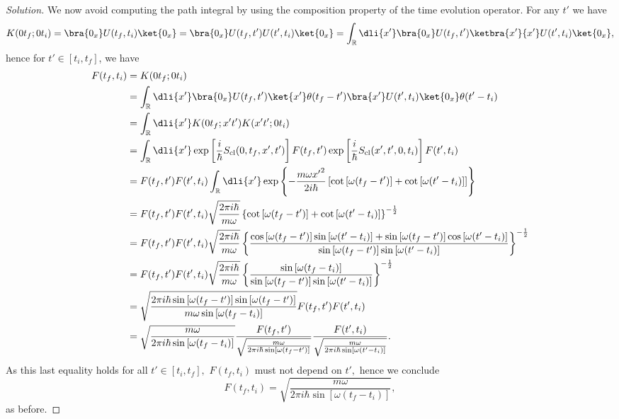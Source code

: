 \begin{proof}[Solution]
   We now avoid computing the path integral by using the composition property of the time evolution operator. For any \(t'\) we have
   \begin{equation*}
      K(0 t_f; 0 t_i) = \bra{0_x} U(t_f, t_i) \ket{0_x} = \bra{0_x} U(t_f, t') U(t', t_i) \ket{0_x} = \int_{\mathbb{R}}\dli{x'} \bra{0_x} U(t_f, t') \ketbra{x'}{x'} U(t', t_i) \ket{0_x},
   \end{equation*}
   hence for \(t' \in [t_i, t_f]\), we have
   \begin{align*}
      F(t_f, t_i) &= K(0 t_f; 0 t_i)\\
                  &= \int_{\mathbb{R}} \dli{x'} \bra{0_x}U(t_f, t')\ket{x'} \theta(t_f - t') \bra{x'} U(t', t_i) \ket{0_x} \theta(t' - t_i)\\
                  &= \int_{\mathbb{R}} \dli{x'} K(0t_f; x' t') K(x' t'; 0t_i)\\
                  &= \int_{\mathbb{R}} \dli{x'} \exp\left[\frac{i}{\hbar}S_\mathrm{cl}(0, t_f, x', t')\right] F(t_f, t') \exp\left[\frac{i}{\hbar}S_\mathrm{cl}(x', t', 0, t_i)\right] F(t', t_i)\\
                  &= F(t_f, t') F(t', t_i) \int_{\mathbb{R}} \dli{x'} \exp\left\{-\frac{m \omega {x'}^2}{2i\hbar} \left[\cot\left[\omega(t_f - t')\right] + \cot\left[\omega(t' - t_i)\right] \right]\right\}\\
                  &= F(t_f, t') F(t', t_i) \sqrt{\frac{2 \pi i\hbar}{m \omega}} \left\{\cot\left[\omega(t_f - t')\right] + \cot\left[\omega(t' - t_i)\right]\right\}^{-\frac12}\\
                  &= F(t_f, t') F(t', t_i) \sqrt{\frac{2 \pi i \hbar}{m \omega}} \left\{\frac{\cos\left[\omega(t_f - t')\right]\sin\left[\omega(t' - t_i)\right] + \sin\left[\omega(t_f - t')\right]\cos\left[\omega(t' - t_i)\right]}{\sin\left[\omega(t_f - t')\right]\sin\left[\omega(t' - t_i)\right]}\right\}^{-\frac12}\\
                  &= F(t_f, t') F(t', t_i) \sqrt{\frac{2 \pi i \hbar}{m \omega}} \left\{\frac{\sin\left[\omega(t_f - t_i)\right]}{\sin\left[\omega(t_f - t')\right]\sin\left[\omega(t' - t_i)\right]}\right\}^{-\frac12}\\
                  &= \sqrt{\frac{2\pi i \hbar \sin\left[\omega (t_f - t')\right]\sin\left[\omega (t_f - t')\right]}{m \omega \sin\left[\omega(t_f - t_i)\right]}} F(t_f, t') F(t', t_i)\\
                  &= \sqrt{\frac{m \omega}{2\pi i \hbar \sin\left[\omega(t_f - t_i)\right]}} \frac{F(t_f, t')}{\sqrt{\frac{m \omega}{2\pi i\hbar \sin\left[\omega( t_f - t')\right]}}} \frac{F(t', t_i)}{\sqrt{\frac{m \omega}{2\pi i\hbar \sin\left[\omega(t' - t_i)\right]}}}.
   \end{align*}
   As this last equality holds for all \(t' \in [t_i, t_f],\) \(F(t_f, t_i)\) must not depend on \(t',\) hence we conclude
   \begin{equation*}
      F(t_f, t_i) = \sqrt{\frac{m \omega}{2\pi i \hbar \sin\left[\omega(t_f - t_i)\right]}},
   \end{equation*}
   as before.


\end{proof}
